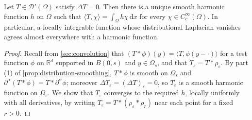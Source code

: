 \begin{theorem}\label{thm:weyl}
Let $T\in\mathcal D'(\Omega)$ satisfy $\Delta T=0$. Then there is a unique smooth harmonic function $h$ on $\Omega$ such that $\langle T,\chi\rangle=\int_\Omega h\chi\,\mathrm dx$ for every $\chi\in C_c^\infty(\Omega)$. In particular, a locally integrable function whose distributional Laplacian vanishes agrees almost everywhere with a harmonic function.
\end{theorem}
\begin{proof}
Recall from \cref{sec:convolution} that $(T*\phi)(y)=\langle T,\phi(y-\cdot)\rangle$ for a test function $\phi$ on $\mathbb R^d$ supported in $\overline{B(0,s)}$ and $y\in\Omega_s$, and that $T_\varepsilon=T*\rho_\varepsilon$. By part (1) of \cref{prop:distribution-smoothing}, $T*\phi$ is smooth on $\Omega_s$ and $\partial^\alpha(T*\phi)=T*\partial^\alpha\phi$; moreover $\Delta T_\varepsilon=(\Delta T)_\varepsilon=0$, so $T_\varepsilon$ is a smooth harmonic function on $\Omega_\varepsilon$. We show that $T_\varepsilon$ converges to the required $h$, locally uniformly with all derivatives, by writing $T_\varepsilon=T*(\rho_\varepsilon*\rho_r)$ near each point for a fixed $r>0$.


\end{proof}
